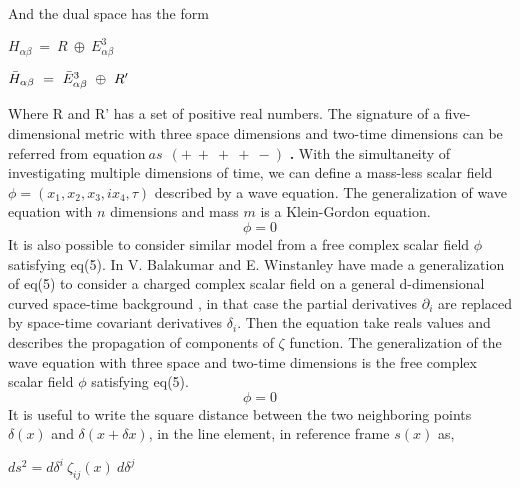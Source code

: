 \documentclass{article}
\begin{document}
And the dual space has the form 
\begin{center}
    \begin{math}
     H_{\alpha \beta} \ = \ R \ \oplus \ E_{\alpha \beta}^3 
     \end{math}
     \end{center}
     \begin{center}
     \begin{math}
    \Bar{H}_{\alpha \beta} \ = \ \Bar{E}_{\alpha \beta}^3 \ \oplus \ R' 
    \end{math}
\end{center} 
Where R and R' has a set of positive real numbers.\vspace{3mm} \newline
The signature of a five-dimensional metric with three space dimensions and two-time dimensions can be referred from equation\( ~as~~ \left(+\ +\ +\ +\ - \right)  \) \textbf{.}  With the simultaneity of investigating multiple dimensions of time, we can define a mass-less scalar field  \(  \phi = \left(  x_{1},x_{2},x_{3},ix_4, \tau \right)  \)  described by a wave equation. The generalization of wave equation with $n$ dimensions and mass $m$ is a  Klein-Gordon equation.
\begin{equation}
 [\partial_{i} \partial^{i}- m^2]\phi = 0 
\end{equation}
It is also possible to consider similar model from a free complex scalar field $\phi$ satisfying eq(5). In \cite{8} V. Balakumar and E. Winstanley  have made a generalization of eq(5) to consider a charged complex scalar field on a general d-dimensional curved space-time background , in that case the partial derivatives
$\partial_{i}$ are replaced by space-time covariant derivatives $\delta_{i}$. Then the equation take reals values and describes the propagation of components of $\zeta$  function. The generalization of the wave equation with three space and two-time dimensions is the free complex scalar field $\phi$ satisfying eq(5).
\begin{equation} 
 [\delta_{i} \delta^{i}- m^2-\zeta (R)]\phi  = 0 
\end{equation}
It is useful to write the square distance between the two neighboring points $\delta(x)$ and $\delta(x+\delta x)$, in the line element, in reference frame $s(x)$ as,
\begin{center}
\begin{math}
    ds^2 = d\delta^i \ \zeta _{ij}(x) \ d\delta^j 
   \end{math}
\end{center} 
\end{document}
